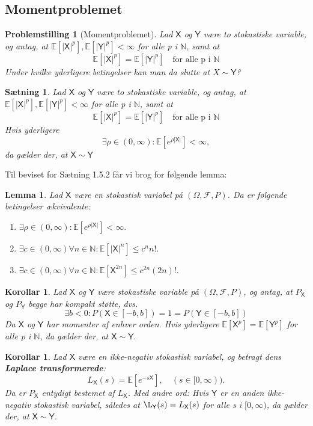 \documentclass{article}
\newcommand{\N}{\mathbb{N}}
\newcommand{\E}{\mathbb{E}}
\newcommand{\1}{\mathbbm{1}}
\newcommand{\X}{\mathsf{X}}
\newcommand{\Y}{\mathsf{Y}}
\newcommand{\pfield}{(\Omega, \mathcal{F}, P)}
\theoremstyle{boxed}
\newtheorem{lemma}[theorem]{Lemma}
\newtheorem{corollary}[theorem]{Korollar}
\newtheorem{proposition}[theorem]{Sætning}
\newtheorem{problemstilling}[theorem]{Problemstilling}
\begin{document}
\subsection{Momentproblemet}
\begin{theorem-box}
    \begin{problemstilling}[Momentproblemet]
        Lad $\X$ og $\Y$ være to stokastiske variable, og antag, at $\E[|\X|^p], \E[|\Y|^p]<\infty$ for alle p i $\N$, samt at
        $$\E[|\X|^p]=\E[|\Y|^p] \quad \text{for alle p i }\N$$
        Under hvilke yderligere betingelser kan man da slutte at $X\sim\Y$?
    \end{problemstilling}
\end{theorem-box}
\begin{theorem-box}
    \begin{proposition}
        Lad $\X$ og $\Y$ være to stokastiske variable, og antag, at $\E[|\X|^p], \E[|\Y|^p]<\infty$ for alle p i $\N$, samt at
        $$\E[|\X|^p]=\E[|\Y|^p] \quad \text{for alle p i }\N$$
        Hvis yderligere 
        $$\exists\rho\in(0,\infty):\E[e^{\rho|\X|}]<\infty,$$
        da gælder der, at $\X\sim\Y$
    \end{proposition}
\end{theorem-box}
Til beviset for Sætning 1.5.2 får vi brog for følgende lemma:
\begin{theorem-box}
    \begin{lemma}
        Lad $\X$ være en stokastisk variabel på $\pfield$. Da er følgende betingelser ækvivalente:
        \begin{enumerate}
            \item[\textnormal{(i)}] $\exists\rho\in(0,\infty):\E[e^{\rho|\X|}]<\infty.$
            \item[\textnormal{(ii)}] $\exists c\in(0,\infty)\forall n\in\N:\E[|\X|^n]\leq c^nn!.$ 
            \item[\textnormal{(iii)}] $\exists c\in(0,\infty)\forall n\in\N:\E[\X^{2n}]\leq c^{2n}(2n)!.$ 
        \end{enumerate}
    \end{lemma}
\end{theorem-box}
\begin{theorem-box}
    \begin{corollary}
        Lad $\X$ og $\Y$ være stokastiske variable på $\pfield$, og antag, at $P_\X$ og $P_\Y$ begge har kompakt støtte, dvs.
        $$\exists b<0:P(\X\in[-b,b])=1=P(\Y\in[-b,b])$$
        Da $\X$ og $\Y$ har momenter af enhver orden. Hvis yderligere $\E[\X^p]=\E[\Y^p]$ for alle p i $\N$, da gælder der, at $\X\sim\Y.$
    \end{corollary}
\end{theorem-box}
\begin{theorem-box}
    \begin{corollary}
        Lad $\X$ være en ikke-negativ stokastisk variabel, og betragt dens \textbf{Laplace transformerede}:
        $$L_\X(s)=\E[e^{-s\X}],\quad (s\in[0,\infty)).$$
        Da er $P_\X$ entydigt bestemet af $L_\X$. Med andre ord: Hvis $\Y$ er en anden ikke-negativ stokastisk variabel, således at $\L_\Y(s)=L_\X(s)$ for alle s i $[0,\infty)$, da gælder der, at $\X\sim\Y.$
    \end{corollary}
\end{theorem-box}
\end{document}
